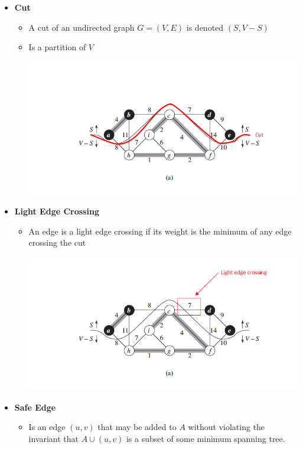 \documentclass[12pt]{article}
\begin{document}
\begin{enumerate}[1.]
\begin{itemize}
        \item \textbf{Cut}

        \begin{itemize}
            \item A cut of an undirected graph $G = (V,E)$ is denoted $(S, V - S)$
            \item Is a partition of $V$

            \begin{center}
            \includegraphics[width=0.8\linewidth]{images/worksheet_4_solution_33.png}
            \end{center}
        \end{itemize}

        \item \textbf{Light Edge Crossing}
        \begin{itemize}
            \item An edge is a light edge crossing if its weight is the minimum of any
            edge crossing the cut

            \begin{center}
            \includegraphics[width=0.8\linewidth]{images/worksheet_4_solution_34.png}
            \end{center}
        \end{itemize}

        \item \textbf{Safe Edge}
        \begin{itemize}
            \item Is an edge $(u,v)$ that may be added to $A$ without violating the invariant that
            $A \cup (u,v)$ is a subset of some minimum spanning tree.
        \end{itemize}


\end{itemize}
\end{enumerate}
\end{document}
